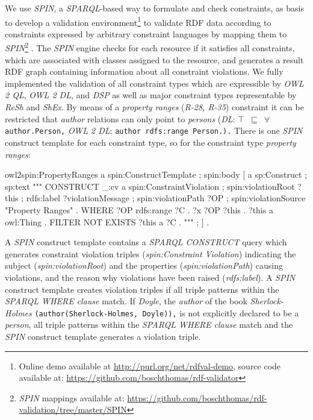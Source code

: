 \documentclass{acm_proc_article-sp}
\newcommand{\ms}[1]{%
  \texttt{#1}
}
\begin{document}
We use \emph{SPIN}, 
a \emph{SPARQL}-based way to formulate and check constraints, as basis to develop a
validation environment\footnote{Online demo available at \url{http://purl.org/net/rdfval-demo}, source code available at: \url{https://github.com/boschthomas/rdf-validator}\label{rdf-validator}} to validate RDF data according to constraints expressed by arbitrary constraint languages by mapping them to \emph{SPIN}\footnote{\emph{SPIN} mappings available at: \url{https://github.com/boschthomas/rdf-validation/tree/master/SPIN}\label{spin-mappings}} \cite{BoschEckert2014-2}.
The \emph{SPIN} engine checks for each resource if it satisfies all constraints, which are associated with classes assigned to the resource, and generates a result RDF graph containing information about all constraint violations.
We fully implemented the validation of all constraint types which are expressible by \emph{OWL 2 QL}, \emph{OWL 2 DL}, and \emph{DSP} 
as well as major constraint types representable by \emph{ReSh} and \emph{ShEx}.
By means of a \emph{property ranges} (\emph{R-28, R-35}) constraint it can be restricted that \emph{author} relations can only point to \emph{persons} (\emph{DL}: {\small\ms{$\top$ $\sqsubseteq$ $\forall$ author.Person,}} \emph{OWL 2 DL}: {\small\ms{author rdfs:range Person.).}}
There is one \emph{SPIN} construct template for each constraint type, so for the constraint type \emph{property ranges}:

\begin{ex}
owl2spin:PropertyRanges a spin:ConstructTemplate ;
  spin:body [ a sp:Construct ; sp:text """
    CONSTRUCT {
      _:cv a spin:ConstraintViolation ;
        spin:violationRoot ?this ;
        rdfs:label ?violationMessage ;
        spin:violationPath ?OP ;
        spin:violationSource "Property Ranges" . }
    WHERE {	  
      ?OP rdfs:range ?C . ?x ?OP ?this . ?this a owl:Thing .
      FILTER NOT EXISTS { ?this a ?C } . } """ ; ] .
\end{ex}

A \emph{SPIN} construct template contains a \emph{SPARQL CONSTRUCT} query which generates constraint violation triples (\emph{spin:Constraint Violation}) indicating the subject (\emph{spin:violationRoot}) and the properties (\emph{spin:violationPath}) causing violations, and the reason why violations have been raised (\emph{rdfs:label}).
A \emph{SPIN} construct template creates violation triples if all triple patterns within the \emph{SPARQL WHERE clause} match.
If \emph{Doyle}, the \emph{author} of the book \emph{Sherlock-Holmes} {\small\ms{(author(Sherlock-Holmes, Doyle)),}} is not explicitly declared to be a \emph{person},
all triple patterns within the \emph{SPARQL WHERE clause} match
and the \emph{SPIN} construct template generates a violation triple.
\end{document}
